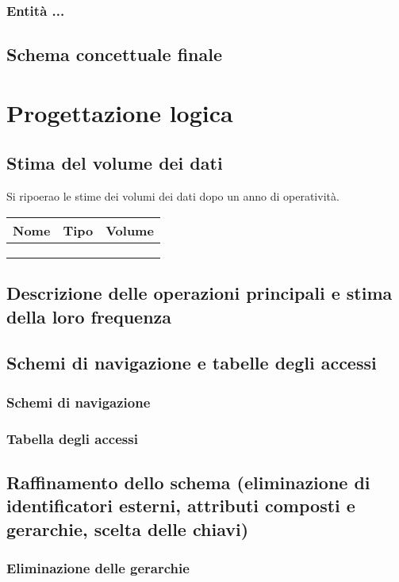 \documentclass[a4paper,12pt]{report}
\begin{document}
	\subsection{Entità ...}
	\section{Schema concettuale finale}
	\chapter{Progettazione logica}
	\section{Stima del volume dei dati}
	\par Si ripoerao le stime dei volumi dei dati dopo un anno di operatività.
	\begin{table}
	\centering
	\begin{tabular}{|l|l|l|}
		\hline
		Nome & Tipo & Volume \\
		\hline
		     &      &        \\
		\hline
		     &      &        \\
		\hline
		     &      &        \\
		\hline
	\end{tabular}
	\end{table}
	\section{Descrizione delle operazioni principali e stima della loro frequenza}
	\section{Schemi di navigazione e tabelle degli accessi}
	\subsection{Schemi di navigazione}
	\subsection{Tabella degli accessi}
	\section{Raffinamento dello schema (eliminazione di identificatori esterni, attributi composti e gerarchie, scelta delle chiavi)}
	\subsection{Eliminazione delle gerarchie}
\end{document}
